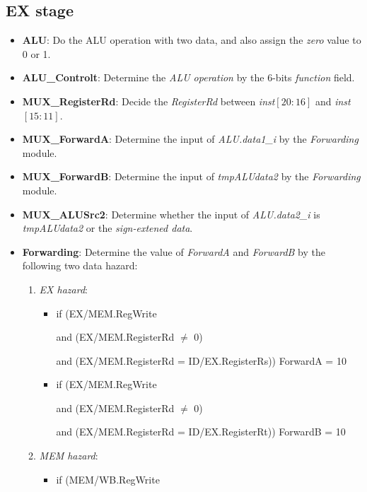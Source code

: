 \documentclass{article}
\begin{document}
    \subsection*{EX stage}
    \begin{itemize}
        \item \textbf{ALU}: Do the ALU operation with two data, and also assign the \textit{zero} value to 0 or 1.
        \item \textbf{ALU\_Controlt}: Determine the \textit{ALU operation} by the 6-bits \textit{function} field.
        \item \textbf{MUX\_RegisterRd}: Decide the \textit{RegisterRd} between \textit{inst$[20:16]$} and \textit{inst$[15:11]$}.
        \item \textbf{MUX\_ForwardA}: Determine the input of \textit{ALU.data1\_i} by the \textit{Forwarding} module. 
        \item \textbf{MUX\_ForwardB}: Determine the input of \textit{tmpALUdata2} by the \textit{Forwarding} module.
        \item \textbf{MUX\_ALUSrc2}: Determine whether the input of \textit{ALU.data2\_i} is \textit{tmpALUdata2} or the \textit{sign-extened data}.
        \item \textbf{Forwarding}: Determine the value of \textit{ForwardA} and \textit{ForwardB} by the following two data hazard:
        \begin{enumerate}
            \item \textit{EX hazard}:
            \begin{itemize}    
                \item if (EX/MEM.RegWrite 

                      and (EX/MEM.RegisterRd $\ne$ 0) 

                      and (EX/MEM.RegisterRd = ID/EX.RegisterRs)) ForwardA = 10
                \item if (EX/MEM.RegWrite 
                    
                      and (EX/MEM.RegisterRd $\ne$ 0) 
                      
                      and (EX/MEM.RegisterRd = ID/EX.RegisterRt)) ForwardB = 10
            \end{itemize}
            \item \textit{MEM hazard}:
            \begin{itemize}
                \item if (MEM/WB.RegWrite 
                

\end{itemize}
\end{enumerate}
\end{itemize}
\end{document}
